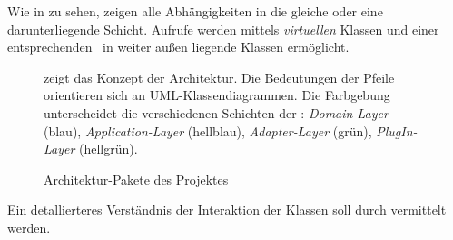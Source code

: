 



Wie in  zu sehen, zeigen alle Abhängigkeiten in die gleiche oder eine darunterliegende Schicht. Aufrufe werden mittels \textit{virtuellen} Klassen und einer entsprechenden \DepInv\ in weiter außen liegende Klassen ermöglicht.


\begin{figure}[ht!]
\vspace{0.25cm}
\begin{center}
\caption{Architektur-Pakete des Projektes}
\label{fig:ArchPkg}
\end{center}

\vspace{0.25cm}
 zeigt das Konzept der Architektur. Die Bedeutungen der Pfeile orientieren sich an UML-Klassendiagrammen. Die Farbgebung unterscheidet die verschiedenen Schichten der \clean: \textit{Domain-Layer} (blau), \textit{Application-Layer} (hellblau), \textit{Adapter-Layer} (grün), \textit{PlugIn-Layer} (hellgrün).
\end{figure}



Ein detallierteres Verständnis der Interaktion der Klassen soll durch  vermittelt werden.

